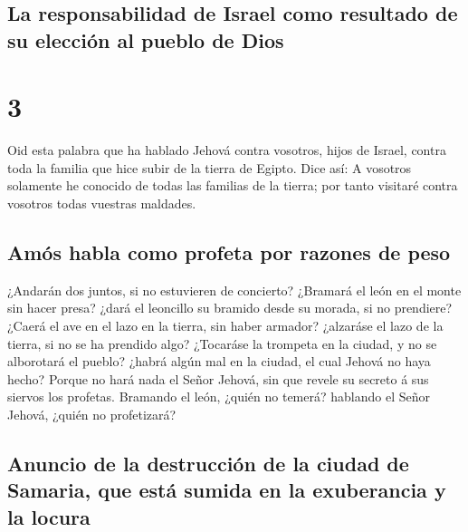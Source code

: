 \hypertarget{la-responsabilidad-de-israel-como-resultado-de-su-elecciuxf3n-al-pueblo-de-dios}{%
\subsection{La responsabilidad de Israel como resultado de su elección
al pueblo de
Dios}\label{la-responsabilidad-de-israel-como-resultado-de-su-elecciuxf3n-al-pueblo-de-dios}}

\hypertarget{section-2}{%
\section{3}\label{section-2}}

 Oid esta palabra que ha hablado Jehová contra vosotros,
hijos de Israel, contra toda la familia que hice subir de la tierra de
Egipto. Dice así:  A vosotros solamente he conocido de
todas las familias de la tierra; por tanto visitaré contra vosotros
todas vuestras maldades.

\hypertarget{amuxf3s-habla-como-profeta-por-razones-de-peso}{%
\subsection{Amós habla como profeta por razones de
peso}\label{amuxf3s-habla-como-profeta-por-razones-de-peso}}

 ¿Andarán dos juntos, si no estuvieren de concierto?
 ¿Bramará el león en el monte sin hacer presa? ¿dará el
leoncillo su bramido desde su morada, si no prendiere? 
¿Caerá el ave en el lazo en la tierra, sin haber armador? ¿alzaráse el
lazo de la tierra, si no se ha prendido algo?  ¿Tocaráse
la trompeta en la ciudad, y no se alborotará el pueblo? ¿habrá algún mal
en la ciudad, el cual Jehová no haya hecho?  Porque no
hará nada el Señor Jehová, sin que revele su secreto á sus siervos los
profetas.  Bramando el león, ¿quién no temerá? hablando el
Señor Jehová, ¿quién no profetizará?

\hypertarget{anuncio-de-la-destrucciuxf3n-de-la-ciudad-de-samaria-que-estuxe1-sumida-en-la-exuberancia-y-la-locura}{%
\subsection{Anuncio de la destrucción de la ciudad de Samaria, que está
sumida en la exuberancia y la
locura}\label{anuncio-de-la-destrucciuxf3n-de-la-ciudad-de-samaria-que-estuxe1-sumida-en-la-exuberancia-y-la-locura}}

